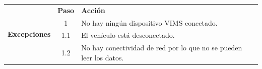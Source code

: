 \begin{table}[H]
\begin{tabularx}{\textwidth}{|c|c|X|}
    \hline
    \multirow{5}{*}{\textbf{Excepciones}}       & \textbf{Paso}                                                                                                        & \textbf{Acción}                                                                                                                                                                \\
    \cline{2-3}
                                                & 1                                                                                                                    & \multicolumn{1}{L|}{No hay ningún dispositivo \ac{VIMS} conectado.}                                                                                                            \\
    \cline{2-3}
                                                & 1.1                                                                                                                  & \multicolumn{1}{L|}{El vehículo está desconectado.}                                                                                                                            \\
    \cline{2-3}
                                                & 1.2                                                                                                                  & \multicolumn{1}{L|}{No hay conectividad de red por lo que no se pueden leer los datos.}                                                                                        \\
    \hline
  \end{tabularx}
\end{table}

